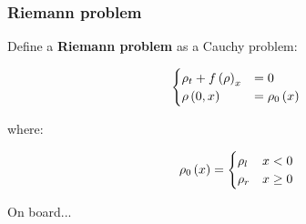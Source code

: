 \begin{frame}
\frametitle{Riemann problem}

Define a \textbf{Riemann problem} as a Cauchy problem:

\begin{equation}
\begin{cases}
\rho_{t}+f\left(\rho\right)_{x} & =0\\
\rho\left(0,x\right) & =\rho_{0}\left(x\right)
\end{cases}
\end{equation}

where:

\begin{equation}
\rho_{0}\left(x\right) = 
\begin{cases}
\rho_l & x < 0 \\ 
\rho_r & x \ge 0 \\ 
\end{cases}
\end{equation}
%

\begin{example}
On board...
\end{example}

\end{frame}

